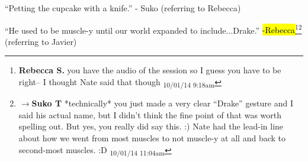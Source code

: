 
``Petting the cupcake with a knife.'' - Suko (referring to Rebecca)



``He used to be muscle-y until our world expanded to include...Drake.'' \hl{-Rebecca}\footnote{\textbf{Rebecca S. }you have the audio of the session so I guess you have to be right-- I thought Nate said that though \textsubscript{10/01/14 9:18am}}\footnote{$\rightarrow$\textbf{Suko T }*technically* you just made a very clear ``Drake'' gesture and I said his actual name, but I didn't think the fine point of that was worth spelling out.  But yes, you really did say this. :) Nate had the lead-in line about how we went from most muscles to not muscle-y at all and back to second-most muscles. :D \textsubscript{10/01/14 11:04am}} (referring to Javier)


\vspace{\fill}

